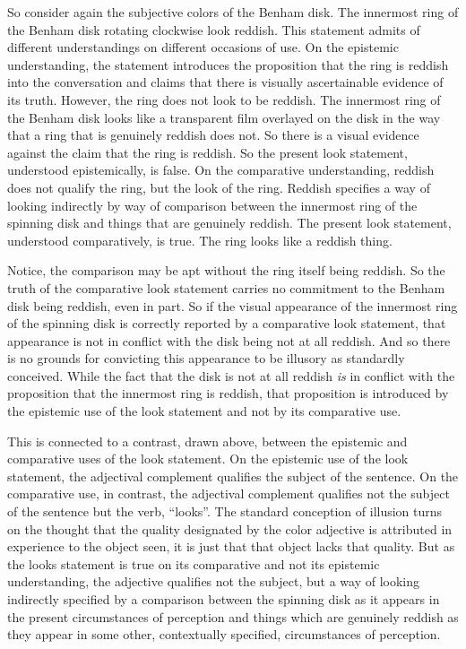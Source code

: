 \documentclass[12pt]{article}
\begin{document}
So consider again the subjective colors of the Benham disk. The innermost ring of the Benham disk rotating clockwise look reddish. This statement admits of different understandings on different occasions of use. On the epistemic understanding, the statement introduces the proposition that the ring is reddish into the conversation and claims that there is visually ascertainable evidence of its truth. However, the ring does not look to be reddish. The innermost ring of the Benham disk looks like a transparent film overlayed on the disk in the way that a ring that is genuinely reddish does not. So there is a visual evidence against the claim that the ring is reddish. So the present look statement, understood epistemically, is false. On the comparative understanding, reddish does not qualify the ring, but the look of the ring. Reddish specifies a way of looking indirectly by way of comparison between the innermost ring of the spinning disk and things that are genuinely reddish. The present look statement, understood comparatively, is true. The ring looks like a reddish thing. 

Notice, the comparison may be apt without the ring itself being reddish. So the truth of the comparative look statement carries no commitment to the Benham disk being reddish, even in part. So if the visual appearance of the innermost ring of the spinning disk is correctly reported by a comparative look statement, that appearance is not in conflict with the disk being not at all reddish. And so there is no grounds for convicting this appearance to be illusory as standardly conceived. While the fact that the disk is not at all reddish \emph{is} in conflict with the proposition that the innermost ring is reddish, that proposition is introduced by the epistemic use of the look statement and not by its comparative use. 

This is connected to a contrast, drawn above, between the epistemic and comparative uses of the look statement. On the epistemic use of the look statement, the adjectival complement qualifies the subject of the sentence. On the comparative use, in contrast, the adjectival complement qualifies not the subject of the sentence but the verb, ``looks''. The standard conception of illusion turns on the thought that the quality designated by the color adjective is attributed in experience to the object seen, it is just that that object lacks that quality. But as the looks statement is true on its comparative and not its epistemic understanding, the adjective qualifies not the subject, but a way of looking indirectly specified by a comparison between the spinning disk as it appears in the present circumstances of perception and things which are genuinely reddish as they appear in some other, contextually specified, circumstances of perception.
\end{document}
